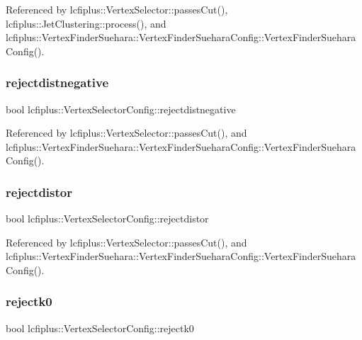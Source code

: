 Referenced by lcfiplus\+::\+Vertex\+Selector\+::passes\+Cut(), lcfiplus\+::\+Jet\+Clustering\+::process(), and lcfiplus\+::\+Vertex\+Finder\+Suehara\+::\+Vertex\+Finder\+Suehara\+Config\+::\+Vertex\+Finder\+Suehara\+Config().

\mbox{\label{classlcfiplus_1_1VertexSelectorConfig_a0733f8036fcd712a3e1a80f192e23216}} 
\subsubsection{rejectdistnegative}
{\footnotesize\ttfamily bool lcfiplus\+::\+Vertex\+Selector\+Config\+::rejectdistnegative}



Referenced by lcfiplus\+::\+Vertex\+Selector\+::passes\+Cut(), and lcfiplus\+::\+Vertex\+Finder\+Suehara\+::\+Vertex\+Finder\+Suehara\+Config\+::\+Vertex\+Finder\+Suehara\+Config().

\mbox{\label{classlcfiplus_1_1VertexSelectorConfig_aac4397be4f2292ee8c8d8d36cc48336c}} 
\subsubsection{rejectdistor}
{\footnotesize\ttfamily bool lcfiplus\+::\+Vertex\+Selector\+Config\+::rejectdistor}



Referenced by lcfiplus\+::\+Vertex\+Selector\+::passes\+Cut(), and lcfiplus\+::\+Vertex\+Finder\+Suehara\+::\+Vertex\+Finder\+Suehara\+Config\+::\+Vertex\+Finder\+Suehara\+Config().

\mbox{\label{classlcfiplus_1_1VertexSelectorConfig_abc82afe3048e95721fe135f4c575897b}} 
\subsubsection{rejectk0}
{\footnotesize\ttfamily bool lcfiplus\+::\+Vertex\+Selector\+Config\+::rejectk0}



